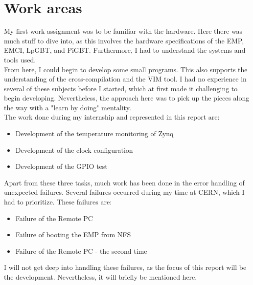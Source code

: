 \chapter{Work areas}

My first work assignment was to be familiar with the hardware. Here there was much stuff to dive into, as this involves the hardware specifications of the EMP, EMCI, LpGBT, and PiGBT. Furthermore, I had to understand the systems and tools used. \\

\noindent From here, I could begin to develop some small programs. This also supports the understanding of the cross-compilation and the VIM tool. I had no experience in several of these subjects before I started, which at first made it challenging to begin developing. Nevertheless, the approach here was to pick up the pieces along the way with a "learn by doing" mentality. \\

\noindent The work done during my internship and represented in this report are:

\begin{itemize}
    \item Development of the temperature monitoring of Zynq
    \item Development of the clock configuration
    \item Development of the GPIO test
\end{itemize}

\noindent Apart from these three tasks, much work has been done in the error handling of unexpected failures. Several failures occurred during my time at CERN, which I had to prioritize. These failures are:

\begin{itemize}
    \item Failure of the Remote PC
    \item Failure of booting the EMP from NFS
    \item Failure of the Remote PC - the second time
\end{itemize}

\noindent I will not get deep into handling these failures, as the focus of this report will be the development. Nevertheless, it will briefly be mentioned here.

